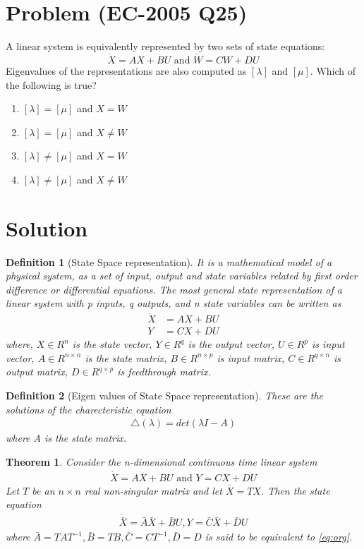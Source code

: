 \documentclass[journal,12pt,twocolumn]{IEEEtran}
\newtheorem{theorem}{Theorem}[section]
\newtheorem{definition}{Definition}[section]
\begin{document}
\section{Problem (EC-2005 Q25)}
A linear system is equivalently represented by two sets of state equations:
$$\dot X=AX+BU \text{ and } \dot W=CW+DU$$
Eigenvalues of the representations are also computed as $[\lambda]$ and $[\mu]$. Which of the following is true?
\begin{enumerate}
    \item $[\lambda]=[\mu]$ and $X=W$
    \item $[\lambda]=[\mu]$ and $X\neq W$
    \item $[\lambda]\neq [\mu]$ and $X=W$
    \item $[\lambda]\neq[\mu]$ and $X\neq W$
\end{enumerate}
\section{Solution}
\begin{definition}[State Space representation]
It is a mathematical model of a physical system, as a set of input, output and state variables related by first order difference or differential equations. The most general state representation of a linear system with p inputs, q outputs, and n state variables can be written as
\begin{align}
    \dot X&=AX+BU\\
    Y&=CX+DU
\end{align}
where, $X\in R^n$ is the state vector, $Y\in R^q$ is the output vector, $U\in R^p$ is input vector, $A\in R^{n\times n}$ is the state matrix, $B\in R^{n\times p}$ is input matrix, $C\in R^{q\times n}$ is output matrix, $D\in R^{q\times p}$ is feedthrough matrix.
\end{definition}
\begin{definition}[Eigen values of State Space representation] 
These are the solutions of the charecteristic equation
\begin{align}
    \triangle(\lambda)=det(\lambda I-A)
\end{align}
where A is the state matrix. 
\end{definition}
\begin{theorem}
Consider the n-dimensional continuous time linear system
\begin{align}
    \dot X=AX+BU \text{ and } Y=CX+DU
    \label{eq:org}
\end{align}
Let $T$ be an $n\times n$ real non-singular matrix and let $\bar X= TX$. Then the state equation 
\begin{align}
    \dot{\bar X}=\bar A\bar X+ \bar BU, Y=\bar C\bar X+\bar DU
\end{align}
where $\bar A=TAT^{-1}, \bar B=TB, \bar C=CT^{-1}, \bar D=D$ is said to be equivalent to \eqref{eq:org}.
\label{eq:th1}
\end{theorem}
\end{document}
